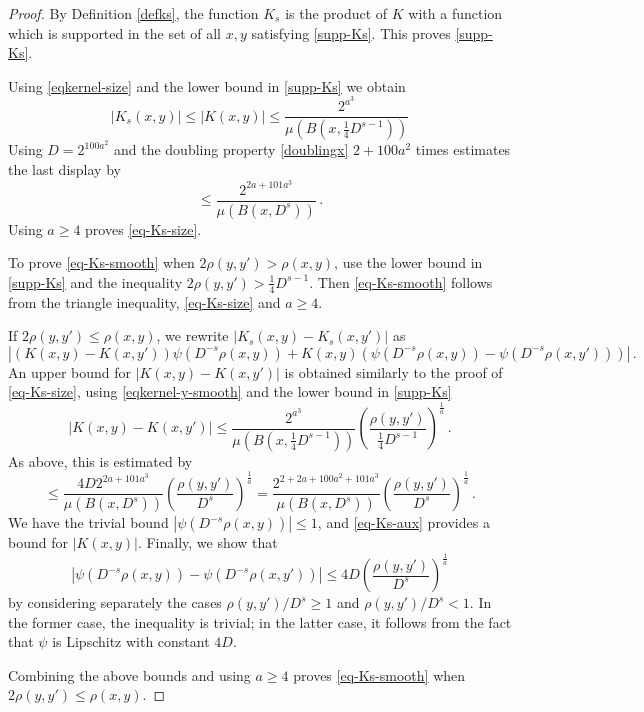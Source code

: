\documentclass[10pt,a4paper]{article}
\theoremstyle{plain}
\theoremstyle{definition}
\numberwithin{equation}{subsection}
\newcommand{\leanok}{}
\begin{document}
\begin{proof}
    \leanok
    By Definition \eqref{defks}, the function $K_s$ is the product of
    $K$ with a function which is supported in the set of all
    $x,y$ satisfying \eqref{supp-Ks}. This proves
    \eqref{supp-Ks}.

    Using \eqref{eqkernel-size} and the lower bound in \eqref{supp-Ks}
    we obtain
    \begin{equation}
        \label{eqkernel-size-Ks}
        |K_s(x,y)|\le |K(x,y)|\le \frac{2^{a^3}}{\mu(B(x,\frac 14 D^{s-1}))}
    \end{equation}
    Using $D=2^{100a^2}$
    and the doubling property \eqref{doublingx} $2 +100a^2$ times estimates
    the last display by
    \begin{equation}
        \label{eq-Ks-aux}
        \le \frac{2^{2a+101a^3}}{\mu(B(x, D^{s}))}\, .
    \end{equation}
    Using $a\ge 4$ proves \eqref{eq-Ks-size}.

    To prove \eqref{eq-Ks-smooth} when $2\rho(y,y') > \rho(x,y)$, use the lower bound in
    \eqref{supp-Ks} and the inequality $2\rho(y,y') > \frac{1}{4}D^{s-1}$. Then \eqref{eq-Ks-smooth} follows from
    the triangle inequality, \eqref{eq-Ks-size} and $a \ge 4$.

    If $2\rho(y,y') \le \rho(x,y)$, we rewrite $|K_s(x,y)-K_s(x, y')|$ as
    \begin{equation}
        |(K(x,y)-K(x,y')) \psi(D^{-s}\rho(x,y)) +
        K(x,y)(\psi(D^{-s}\rho(x,y))-\psi(D^{-s}\rho(x,y')))|\,.
    \end{equation}
    An upper bound for $|K(x,y)-K(x, y')|$ is obtained similarly to the proof of
    \eqref{eq-Ks-size}, using \eqref{eqkernel-y-smooth} and the lower bound in \eqref{supp-Ks}
    \begin{equation}
        |K(x,y)-K(x, y')|\le \frac{2^{a^3}}{\mu(B(x, \frac 14 D^{s-1}))}
        \left(\frac{ \rho(y,y')}{\frac 14 D^{s-1}}\right)^{\frac 1a}\,.
    \end{equation}
    As above, this is estimated by
    \begin{equation}
       \le \frac{4D 2^{2a+101a^3}}{\mu(B(x, D^{s}))}
        \left(\frac{ \rho(y,y')}{D^{s}}\right)^{\frac 1a}
         = \frac{2^{2+2a+100a^2+101a^3}}{\mu(B(x, D^{s}))}
        \left(\frac{ \rho(y,y')}{D^{s}}\right)^{\frac 1a}\,.
    \end{equation}
    We have the trivial bound $|\psi(D^{-s}\rho(x,y))| \leq 1$, and \eqref{eq-Ks-aux}
    provides a bound for $|K(x,y)|$. Finally, we show that
    \begin{equation}
        |\psi(D^{-s}\rho(x,y))-\psi(D^{-s}\rho(x,y'))|\le
        4D \left(\frac{\rho(y, y')}{D ^ s}\right)^{\frac 1a}
    \end{equation}
    by considering separately the cases $\rho(y,y')/D^s \ge 1$ and $\rho(y,y')/D^s < 1$. In the
    former case, the inequality is trivial; in the latter case, it follows from the
    fact that $\psi$ is Lipschitz with constant $4D$.

    Combining the above bounds and using $a\ge 4$ proves \eqref{eq-Ks-smooth} when
    $2\rho(y,y') \le \rho(x,y)$.
\end{proof}
\end{document}
